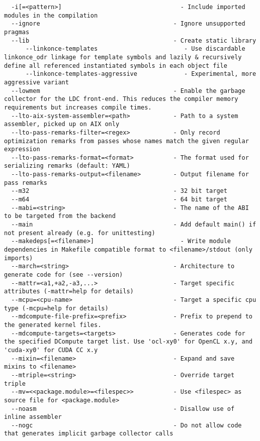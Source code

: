 \documentclass{studrep}
\begin{document}
\begin{verbatim}
  -i[=<pattern>]                                 - Include imported modules in the compilation
  --ignore                                     - Ignore unsupported pragmas
  --lib                                        - Create static library
      --linkonce-templates                        - Use discardable linkonce_odr linkage for template symbols and lazily & recursively define all referenced instantiated symbols in each object file
      --linkonce-templates-aggressive             - Experimental, more aggressive variant
  --lowmem                                     - Enable the garbage collector for the LDC front-end. This reduces the compiler memory requirements but increases compile times.
  --lto-aix-system-assembler=<path>            - Path to a system assembler, picked up on AIX only
  --lto-pass-remarks-filter=<regex>            - Only record optimization remarks from passes whose names match the given regular expression
  --lto-pass-remarks-format=<format>           - The format used for serializing remarks (default: YAML)
  --lto-pass-remarks-output=<filename>         - Output filename for pass remarks
  --m32                                        - 32 bit target
  --m64                                        - 64 bit target
  --mabi=<string>                              - The name of the ABI to be targeted from the backend
  --main                                       - Add default main() if not present already (e.g. for unittesting)
  --makedeps[=<filename>]                        - Write module dependencies in Makefile compatible format to <filename>/stdout (only imports)
  --march=<string>                             - Architecture to generate code for (see --version)
  --mattr=<a1,+a2,-a3,...>                     - Target specific attributes (-mattr=help for details)
  --mcpu=<cpu-name>                            - Target a specific cpu type (-mcpu=help for details)
  --mdcompute-file-prefix=<prefix>             - Prefix to prepend to the generated kernel files.
  --mdcompute-targets=<targets>                - Generates code for the specified DCompute target list. Use 'ocl-xy0' for OpenCL x.y, and 'cuda-xy0' for CUDA CC x.y
  --mixin=<filename>                           - Expand and save mixins to <filename>
  --mtriple=<string>                           - Override target triple
  --mv=<<package.module>=<filespec>>           - Use <filespec> as source file for <package.module>
  --noasm                                      - Disallow use of inline assembler
  --nogc                                       - Do not allow code that generates implicit garbage collector calls

\end{verbatim}
\end{document}
